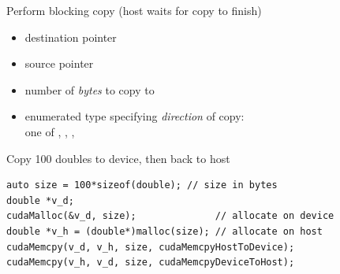 \begin{frame}[fragile]{}
    \begin{info}{Perform blocking copy (host waits for copy to finish)}
        \centering {}
    \begin{itemize}
        \item {} destination pointer
        \item {} source pointer
        \item {} number of \emph{bytes} to copy to 
        \item {} enumerated type specifying \emph{direction} of copy:
            \\ one of
            , , , 
    \end{itemize}
    \end{info}

    \begin{code}{Copy 100 doubles to device, then back to host}
        \begin{lstlisting}[style=boxcuda]
auto size = 100*sizeof(double); // size in bytes
double *v_d;
cudaMalloc(&v_d, size);              // allocate on device
double *v_h = (double*)malloc(size); // allocate on host
cudaMemcpy(v_d, v_h, size, cudaMemcpyHostToDevice);
cudaMemcpy(v_h, v_d, size, cudaMemcpyDeviceToHost);
\end{lstlisting}
    \end{code}
\end{frame}

